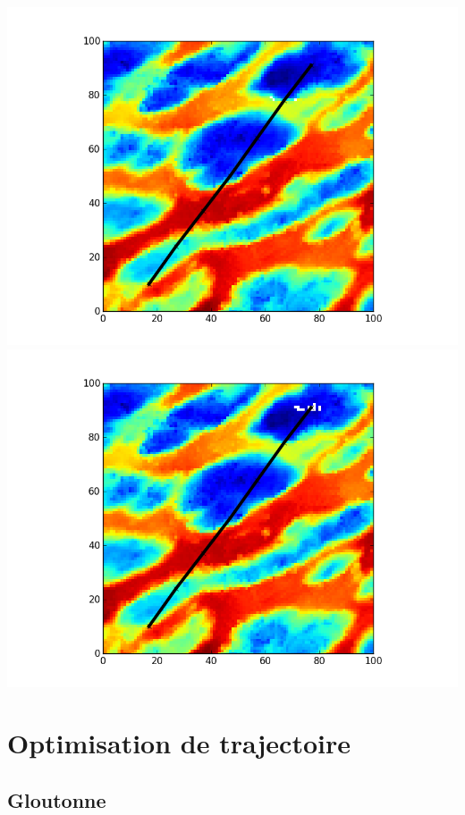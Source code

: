 \documentclass[11pt]{beamer}
\begin{document}
\begin{frame}
\begin{overlayarea}{\textwidth}{\textheight}
 {\includegraphics[scale=.5]{../data/illustration_recalage_baseline/plot_A_10_17_B_91_77_iteration_005.png}}
 {\includegraphics[scale=.5]{../data/illustration_recalage_baseline/plot_A_10_17_B_91_77_iteration_006.png}}
\end{overlayarea}
\end{frame}



\section{Optimisation de trajectoire}
\subsection{Gloutonne}
\end{document}
